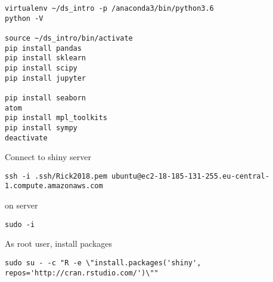\documentclass[]{book}
\theoremstyle{definition}
\theoremstyle{definition}
\theoremstyle{definition}
\theoremstyle{remark}
\begin{document}
\begin{verbatim}
virtualenv ~/ds_intro -p /anaconda3/bin/python3.6
python -V

source ~/ds_intro/bin/activate
pip install pandas
pip install sklearn
pip install scipy
pip install jupyter

pip install seaborn
atom
pip install mpl_toolkits
pip install sympy
deactivate
\end{verbatim}

Connect to shiny server

\begin{verbatim}
ssh -i .ssh/Rick2018.pem ubuntu@ec2-18-185-131-255.eu-central-1.compute.amazonaws.com
\end{verbatim}

on server

\begin{verbatim}
sudo -i
\end{verbatim}

As root user, install packages

\begin{verbatim}
sudo su - -c "R -e \"install.packages('shiny', repos='http://cran.rstudio.com/')\""
\end{verbatim}


\end{document}
